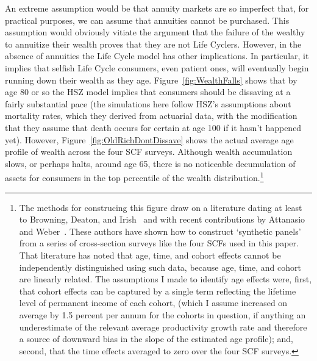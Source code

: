 \documentclass[titlepage,12pt]{article}
\begin{document}
An extreme assumption would be that annuity markets are so imperfect 
that, for practical purposes, we can assume that annuities cannot be 
purchased.  This assumption would obviously vitiate the argument that 
the failure of the wealthy to annuitize their wealth proves that they 
are not Life Cyclers.  However, in the absence of annuities the Life 
Cycle model has other implications.  In particular, it implies that 
selfish Life Cycle consumers, even patient ones, will eventually begin 
running down their wealth as they age.  Figure~\ref{fig:WealthFalls} 
shows that by age 80 or so the HSZ model implies that consumers should 
be dissaving at a fairly substantial pace (the simulations here follow 
HSZ's assumptions about mortality rates, which they derived from 
actuarial data, with the modification that they assume that death 
occurs for certain at age 100 if it hasn't happened yet).  However, 
Figure~\ref{fig:OldRichDontDissave} shows the actual average age 
profile of wealth across the four SCF surveys.  Although wealth 
accumulation slows, or perhaps halts, around age 65, there is no 
noticeable decumulation of assets for consumers in the top percentile 
of the wealth distribution.\footnote{The methods for construcing this 
figure draw on a literature dating at least to Browning, Deaton, and 
Irish~\cite{bdiProfitable} and with recent contributions by Attanasio 
and Weber~\cite{aw95}.  These authors have shown how to 
construct `synthetic panels' from a series of cross-section surveys 
like the four SCFs used in this paper.  That literature has noted that 
age, time, and cohort effects cannot be independently distinguished 
using such data, because age, time, and cohort are linearly related. 
The assumptions I made to identify age effects were, first, that 
cohort effects can be captured by a single term reflecting the 
lifetime level of permanent income of each cohort, (which I assume 
increased on average by 1.5 percent per annum for the cohorts in 
question, if anything an underestimate of the relevant average 
productivity growth rate and therefore a source of downward bias in 
the slope of the estimated age profile); and, second, that the time 
effects averaged to zero over the four SCF surveys.}
\end{document}
